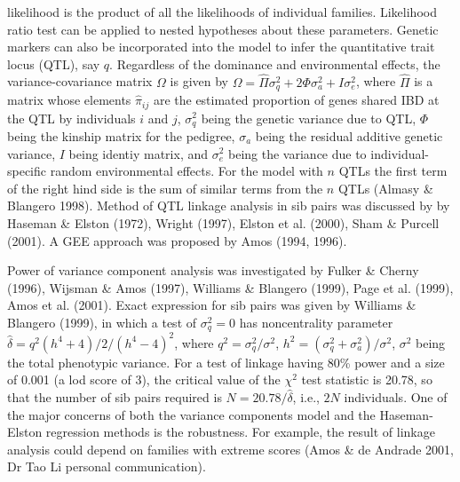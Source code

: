 likelihood is the product of all the likelihoods of individual families.
Likelihood ratio test can be applied to nested hypotheses about these
parameters.  Genetic markers can also be incorporated into the model to infer
the quantitative trait locus (QTL), say $q$.  Regardless of the dominance and
environmental effects, the variance-covariance matrix $\Omega$ is given by
$\Omega=\hat\Pi\sigma_q^2+2\Phi\sigma_a^2+I\sigma_e^2$, where $\hat\Pi$ is a
matrix whose elements $\hat\pi_{ij}$ are the estimated proportion of genes
shared IBD at the QTL by individuals $i$ and $j$, $\sigma_q^2$ being the
genetic variance due to QTL, $\Phi$ being the kinship matrix for the pedigree,
$\sigma_a$ being the residual additive genetic variance, $I$ being identiy
matrix, and $\sigma_e^2$ being the variance due to individual-specific random
environmental effects.  For the model with $n$ QTLs the first term of the right
hind side is the sum of similar terms from the $n$ QTLs (Almasy \& Blangero
1998).  Method of QTL linkage analysis in sib pairs was discussed by by Haseman
\& Elston (1972), Wright (1997), Elston et al.  (2000), Sham \& Purcell (2001).
A GEE approach was proposed by Amos (1994, 1996).

Power of variance component analysis was investigated by Fulker \& Cherny
(1996), Wijsman \& Amos (1997), Williams \& Blangero (1999), Page et al.
(1999), Amos et al.  (2001).  Exact expression for sib pairs was given by
Williams \& Blangero (1999), in which a test of $\sigma_q^2=0$ has
noncentrality parameter $\hat\delta=q^2(h^4+4)/2/(h^4-4)^2$, where
$q^2=\sigma_q^2/\sigma^2$, $h^2=(\sigma_q^2+\sigma_a^2)/\sigma^2$, $\sigma^2$
being the total phenotypic variance.  For a test of linkage having 80\% power
and a size of 0.001 (a lod score of 3), the critical value of the $\chi^2$ test
statistic is 20.78, so that the number of sib pairs required is
$N=20.78/\hat\delta$, i.e., $2N$ individuals.  One of the major concerns of
both the variance components model and the Haseman-Elston regression methods is
the robustness.  For example, the result of linkage analysis could depend on
families with extreme scores (Amos \& de Andrade 2001, Dr Tao Li personal
communication).

